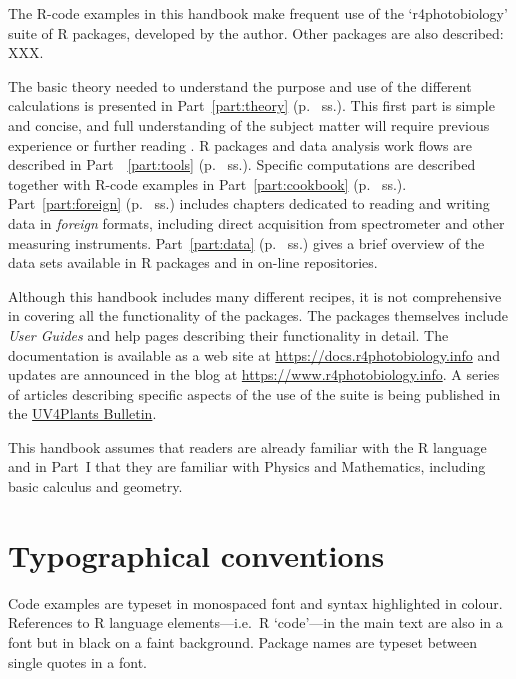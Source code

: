 The R-code examples in this handbook make frequent use of the `r4photobiology' suite of R packages, developed by the author. Other packages are also described: XXX.

The basic theory needed to understand the purpose and use of the different calculations is presented in Part~\ref{part:theory} (p.~\pageref{part:theory} ss.). This first part is simple and concise, and full understanding of the subject matter will require previous experience or further reading \autocite[e.g.][]{Aphalo2012,Bjoern2015}.
R packages and data analysis work flows are described in Part~~\ref{part:tools} (p.~\pageref{part:tools} ss.).
Specific computations are described together with R-code examples in Part~\ref{part:cookbook} (p.~\pageref{part:cookbook} ss.).
Part~\ref{part:foreign} (p.~\pageref{part:foreign} ss.) includes chapters dedicated to reading and writing data in \emph{foreign} formats, including direct acquisition from spectrometer and other measuring instruments. Part~\ref{part:data} (p.~\pageref{part:data} ss.) gives a brief overview of the data sets available in R packages and in on-line repositories.

Although this handbook includes many different recipes, it is not comprehensive in covering all the functionality of the packages. The packages themselves include \emph{User Guides} and help pages describing their functionality in detail. The documentation is available as a web site at \url{https://docs.r4photobiology.info} and updates are announced in the blog at \url{https://www.r4photobiology.info}. A series of articles describing specific aspects of the use of the suite is being published in the \href{http://uv4plants.org/publications/uv4plants-bulletin-published-issues/}{UV4Plants Bulletin}.

This handbook assumes that readers are already familiar with the R language and in Part~I that they are familiar with Physics and Mathematics, including basic calculus and geometry.

\section{Typographical conventions}

Code examples are typeset in monospaced font and syntax highlighted in colour. References to R language elements---i.e.\ R `code'---in the main text are also in a  font but in black on a faint background. Package names are typeset between single quotes in a  font.

